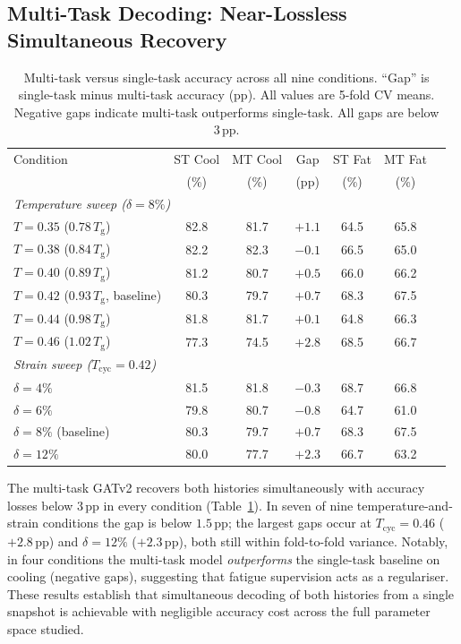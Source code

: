 \documentclass[12pt,a4paper]{article}
\newcommand{\Tg}{T_{\mathrm{g}}}
\newcommand{\Tbat}{T_{\mathrm{cyc}}}
\newcommand{\degpp}{\,\text{pp}}
\begin{document}
\subsection{Multi-Task Decoding: Near-Lossless Simultaneous Recovery}
\label{sec:multitask}

\begin{table}[htbp]
\centering
\caption{Multi-task versus single-task accuracy across all nine conditions. ``Gap'' is single-task minus multi-task accuracy (pp). All values are 5-fold CV means. Negative gaps indicate multi-task outperforms single-task. All gaps are below $3\degpp$.}
\label{tab:multitask}
\begin{tabular}{lcccccc}
\toprule
Condition & ST Cool & MT Cool & Gap & ST Fat & MT Fat \\
          & (\%)    & (\%)    & (pp) & (\%)  & (\%) \\
\midrule
\multicolumn{6}{l}{\textit{Temperature sweep ($\delta = 8\%$)}} \\
$T = 0.35$ ($0.78\,\Tg$) & 82.8 & 81.7 & $+1.1$ & 64.5 & 65.8 \\
$T = 0.38$ ($0.84\,\Tg$) & 82.2 & 82.3 & $-0.1$ & 66.5 & 65.0 \\
$T = 0.40$ ($0.89\,\Tg$) & 81.2 & 80.7 & $+0.5$ & 66.0 & 66.2 \\
$T = 0.42$ ($0.93\,\Tg$, baseline) & 80.3 & 79.7 & $+0.7$ & 68.3 & 67.5 \\
$T = 0.44$ ($0.98\,\Tg$) & 81.8 & 81.7 & $+0.1$ & 64.8 & 66.3 \\
$T = 0.46$ ($1.02\,\Tg$) & 77.3 & 74.5 & $+2.8$ & 68.5 & 66.7 \\
\midrule
\multicolumn{6}{l}{\textit{Strain sweep ($\Tbat = 0.42$)}} \\
$\delta = 4\%$ & 81.5 & 81.8 & $-0.3$ & 68.7 & 66.8 \\
$\delta = 6\%$ & 79.8 & 80.7 & $-0.8$ & 64.7 & 61.0 \\
$\delta = 8\%$ (baseline) & 80.3 & 79.7 & $+0.7$ & 68.3 & 67.5 \\
$\delta = 12\%$ & 80.0 & 77.7 & $+2.3$ & 66.7 & 63.2 \\
\bottomrule
\end{tabular}
\end{table}

The multi-task GATv2 recovers both histories simultaneously with accuracy losses below $3\degpp$ in every condition (Table~\ref{tab:multitask}).
In seven of nine temperature-and-strain conditions the gap is below $1.5\degpp$; the largest gaps occur at $\Tbat = 0.46$ ($+2.8\degpp$) and $\delta = 12\%$ ($+2.3\degpp$), both still within fold-to-fold variance.
Notably, in four conditions the multi-task model \emph{outperforms} the single-task baseline on cooling (negative gaps), suggesting that fatigue supervision acts as a regulariser.
These results establish that simultaneous decoding of both histories from a single snapshot is achievable with negligible accuracy cost across the full parameter space studied.
\end{document}

